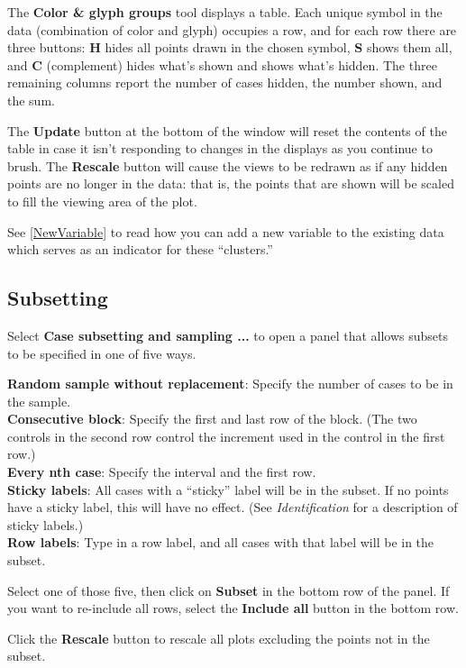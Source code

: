 \documentclass[11pt]{article}
\begin{document}
The {\bf Color \& glyph groups} tool displays a table.  Each unique
symbol in the data (combination of color and glyph) occupies a row,
and for each row there are three buttons:  {\bf H} hides all points
drawn in the chosen symbol, {\bf S} shows them all, and {\bf C} 
(complement) hides
what's shown and shows what's hidden.  The three remaining columns
report the number of cases hidden, the number shown, and the sum.

The {\bf Update} button at the bottom of the window will reset the
contents of the table in case it isn't responding to changes in the
displays as you continue to brush.  The {\bf Rescale} button will cause
the views to be redrawn as if any hidden points are no longer in the
data:  that is, the points that are shown will be scaled to fill the
viewing area of the plot.

See \ref{NewVariable} to read how you can add a new variable to the
existing data which serves as an indicator for these ``clusters.''

\subsection{Subsetting}

Select {\bf Case subsetting and sampling ...} to open a panel
that allows subsets to be specified in one of five ways.

{\bf Random sample without replacement}:  Specify the number of
     cases to be in the sample.
\\{\bf Consecutive block}:  Specify the first and last row of the block.
     (The two controls in the second row control the increment used
     in the control in the first row.)
\\{\bf Every nth case}:  Specify the interval and the first row.
\\{\bf Sticky labels}:  All cases with a ``sticky'' label will
  be in the subset.  If no points have a sticky label, this
  will have no effect. (See {\em Identification} for a description
  of sticky labels.)
\\{\bf Row labels}: Type in a row label, and all cases with that
  label will be in the subset.

Select one of those five, then click on {\bf Subset} in the
bottom row of the panel.  If you want to re-include all rows, 
select the {\bf Include all} button in the bottom row.

Click the {\bf Rescale} button to rescale all plots excluding
the points not in the subset.
\end{document}
